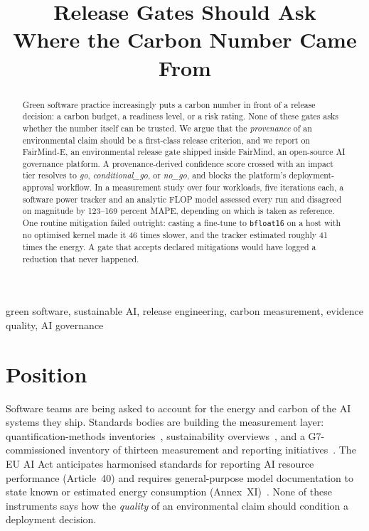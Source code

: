 \documentclass[10pt,conference]{IEEEtran}
\newcommand{\sysname}{FairMind-E}
\begin{document}
\title{Release Gates Should Ask\\Where the Carbon Number Came From}

\author{
}

\maketitle

\begin{abstract}
Green software practice increasingly puts a carbon number in front of a release
decision: a carbon budget, a readiness level, or a risk rating. None of these
gates asks whether the number itself can be trusted. We argue that the
\emph{provenance} of an environmental claim should be a first-class release
criterion, and we report on \sysname, an environmental release gate shipped
inside FairMind, an open-source AI governance platform. A provenance-derived
confidence score crossed with an impact tier resolves to \emph{go},
\emph{conditional\_go}, or \emph{no\_go}, and blocks the platform's
deployment-approval workflow. In a measurement study over four workloads, five
iterations each, a software power tracker and an analytic FLOP model assessed
every run and disagreed on magnitude by 123--169 percent MAPE, depending on
which is taken as reference. One routine mitigation failed outright: casting a
fine-tune to \texttt{bfloat16} on a host with no optimised kernel made it 46
times slower, and the tracker estimated roughly 41 times the energy. A gate
that accepts declared mitigations would have logged a reduction that never
happened.
\end{abstract}

\begin{IEEEkeywords}
green software, sustainable AI, release engineering, carbon measurement,
evidence quality, AI governance
\end{IEEEkeywords}

\section{Position}

Software teams are being asked to account for the energy and carbon of the AI
systems they ship. Standards bodies are building the measurement layer:
quantification-methods inventories~\cite{cen18145}, sustainability
overviews~\cite{iso20226}, and a G7-commissioned inventory of thirteen
measurement and reporting initiatives~\cite{g7}. The EU AI Act anticipates
harmonised standards for reporting AI resource performance (Article~40) and
requires general-purpose model documentation to state known or estimated energy
consumption (Annex~XI)~\cite{aiact}. None of these instruments says how the
\emph{quality} of an environmental claim should condition a deployment
decision.
\end{document}
